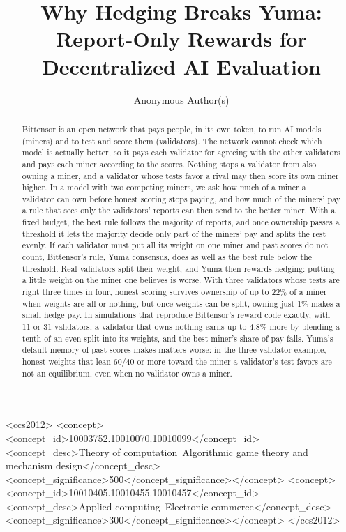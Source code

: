 \documentclass[sigconf,anonymous,review]{acmart}
\title[Why Hedging Breaks Yuma]{Why Hedging Breaks Yuma: Report-Only Rewards for Decentralized AI Evaluation}
\author{Anonymous Author(s)}
\numberwithin{equation}{section}
\begin{document}
\begin{abstract}
Bittensor is an open network that pays people, in its own token, to run AI
models (miners) and to test and score them (validators). The network cannot
check which model is actually better, so it pays each validator for agreeing
with the other validators and pays each miner according to the scores.
Nothing stops a validator from also owning a miner, and a validator whose
tests favor a rival may then score its own miner higher. In a model with two
competing miners, we ask how much of a miner a validator can own before
honest scoring stops paying, and how much of the miners' pay a rule that sees
only the validators' reports can then send to the better miner. With a fixed
budget, the best rule follows the majority of reports, and once ownership
passes a threshold it lets the majority decide only part of the miners' pay
and splits the rest evenly. If each validator must put all its weight on one
miner and past scores do not count, Bittensor's rule, Yuma consensus, does as
well as the best rule below the threshold. Real validators split their
weight, and Yuma then rewards hedging: putting a little weight on the miner
one believes is worse. With three validators whose tests are right three times
in four, honest scoring survives ownership of up to 22\% of a miner when
weights are all-or-nothing, but once weights can be split, owning just 1\%
makes a small hedge pay. In simulations that reproduce Bittensor's reward code
exactly, with 11 or 31 validators, a validator that owns nothing earns up to
4.8\% more by blending a tenth of an even split into its weights, and the best
miner's share of pay falls. Yuma's default memory of past scores makes matters
worse: in the three-validator example, honest weights that lean 60/40 or more
toward the miner a validator's test favors are not an equilibrium, even when
no validator owns a miner.
\end{abstract}

\begin{CCSXML}
<ccs2012>
<concept><concept_id>10003752.10010070.10010099</concept_id>
<concept_desc>Theory of computation~Algorithmic game theory and mechanism design</concept_desc>
<concept_significance>500</concept_significance></concept>
<concept><concept_id>10010405.10010455.10010457</concept_id>
<concept_desc>Applied computing~Electronic commerce</concept_desc>
<concept_significance>300</concept_significance></concept>
</ccs2012>
\end{CCSXML}
\end{document}
